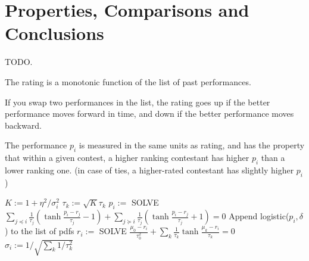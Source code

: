 \documentclass{article}
\begin{document}
\section{Properties, Comparisons and Conclusions}

TODO.

The rating is a monotonic function of the list of past performances.

If you swap two performances in the list, the rating goes up if the better performance moves forward in time, and down if the better performance moves backward.

The performance $p_i$ is measured in the same units as rating, and has the property that within a given contest, a higher ranking contestant has higher $p_i$ than a lower ranking one. (in case of ties, a higher-rated contestant has slightly higher $p_i$)

\begin{algorithm}
\caption{$update(i)$}
\label{alg:update}
\begin{algorithmic}
\STATE $K := 1 + \eta^2/\sigma_i^2$
\STATE $\tau_k := \sqrt{K} \tau_k$
\ENDFOR
\STATE $p_i := $ SOLVE $\sum_{j\preceq i}\frac{1}{\tau_j}\left( \tanh\frac {p_i - r_j} {\tau_j} - 1 \right) + \sum_{j\succeq i}\frac{1}{\tau_j}\left( \tanh\frac {p_i - r_j} {\tau_j} + 1 \right) = 0$
\STATE Append logistic($p_i,\delta$) to the list of pdfs
\STATE $r_i := $ SOLVE $\frac{\mu_0-r_i}{\tau_0^2} + \sum_k \frac{1}{\tau_k} \tanh \frac {\mu_k-r_i} {\tau_k} = 0$
\STATE $\sigma_i := 1 / \sqrt{\sum_k 1/\tau_k^2}$
\end{algorithmic}
\end{algorithm}



\end{document}
